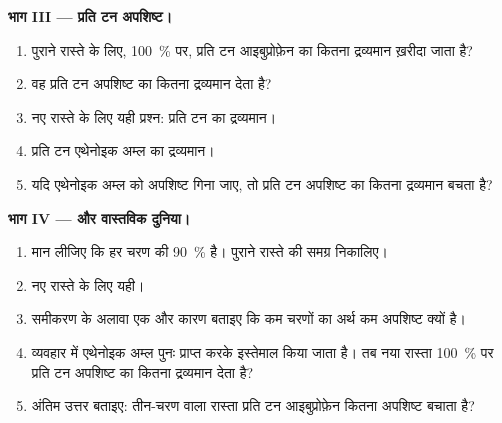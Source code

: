 \begin{problem}
\medskip
\noindent\textbf{भाग III --- प्रति टन अपशिष्ट।}
\begin{enumerate}[resume]
  \item पुराने रास्ते के लिए, \qty{100}{\percent}  पर, प्रति टन आइबुप्रोफ़ेन
         का कितना द्रव्यमान ख़रीदा जाता है?
  \item वह प्रति टन अपशिष्ट का कितना द्रव्यमान देता है?
  \item नए रास्ते के लिए यही प्रश्न: प्रति टन  का द्रव्यमान।
  \item प्रति टन एथेनोइक अम्ल का द्रव्यमान।
  \item यदि एथेनोइक अम्ल को अपशिष्ट गिना जाए, तो प्रति टन अपशिष्ट का कितना
        द्रव्यमान बचता है?
\end{enumerate}

\medskip
\noindent\textbf{भाग IV ---  और वास्तविक दुनिया।}
\begin{enumerate}[resume]
  \item मान लीजिए कि हर चरण की  \qty{90}{\percent} है।
        पुराने रास्ते की समग्र  निकालिए।
  \item नए रास्ते के लिए यही।
  \item समीकरण के अलावा एक और कारण बताइए कि कम चरणों का अर्थ कम अपशिष्ट
        क्यों है।
  \item व्यवहार में एथेनोइक अम्ल पुनः प्राप्त करके इस्तेमाल किया जाता है। तब नया रास्ता
        \qty{100}{\percent}  पर प्रति टन अपशिष्ट का कितना द्रव्यमान
        देता है?
  \item अंतिम उत्तर बताइए: तीन-चरण वाला रास्ता प्रति टन आइबुप्रोफ़ेन कितना अपशिष्ट
        बचाता है?
\end{enumerate}
\end{problem}
